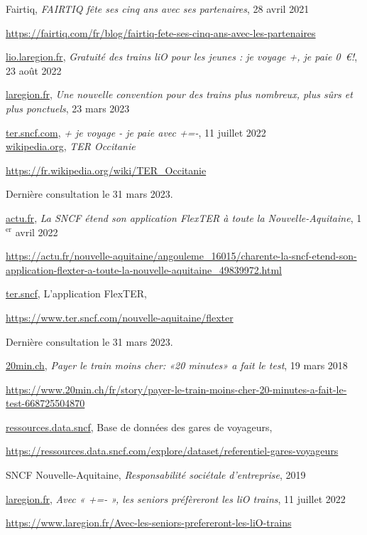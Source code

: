 \documentclass[a4paper]{article}
\begin{document}
\newpage


\begin{thebibliography}{99}
   Fairtiq, \textit{FAIRTIQ fête ses cinq ans avec ses partenaires}, 28 avril 2021

  \url{https://fairtiq.com/fr/blog/fairtiq-fete-ses-cinq-ans-avec-les-partenaires}


   \url{lio.laregion.fr}, \textit{Gratuité des trains liO pour les jeunes : je voyage +, je paie 0~\euro !}, 23 août 2022

   \url{laregion.fr}, \textit{Une nouvelle convention pour des trains plus nombreux, plus sûrs et plus ponctuels}, 23 mars 2023


   \url{ter.sncf.com}, \textit{+ je voyage - je paie avec +=-}, 11 juillet 2022\\


   \url{wikipedia.org}, \textit{TER Occitanie}

  \url{https://fr.wikipedia.org/wiki/TER_Occitanie}

  Dernière consultation le 31 mars 2023.


   \url{actu.fr}, \textit{La SNCF étend son application FlexTER à toute la Nouvelle-Aquitaine}, 1$^{\text{er}}$ avril 2022

  \url{https://actu.fr/nouvelle-aquitaine/angouleme_16015/charente-la-sncf-etend-son-application-flexter-a-toute-la-nouvelle-aquitaine_49839972.html}


   \url{ter.sncf}, L'application FlexTER,

  \url{https://www.ter.sncf.com/nouvelle-aquitaine/flexter}

  Dernière consultation le 31 mars 2023.

  \url{20min.ch}, \textit{Payer le train moins cher: «20 minutes» a fait le test}, 19 mars 2018


  \url{https://www.20min.ch/fr/story/payer-le-train-moins-cher-20-minutes-a-fait-le-test-668725504870}


   \url{ressources.data.sncf}, Base de données des gares de voyageurs,

  \url{https://ressources.data.sncf.com/explore/dataset/referentiel-gares-voyageurs}

  SNCF Nouvelle-Aquitaine, \textit{Responsabilité sociétale d'entreprise}, 2019

   \url{laregion.fr},
  \textit{Avec « +=- », les seniors préfèreront les liO trains},  11 juillet 2022

  \url{https://www.laregion.fr/Avec-les-seniors-prefereront-les-liO-trains}

\end{thebibliography}
\end{document}
